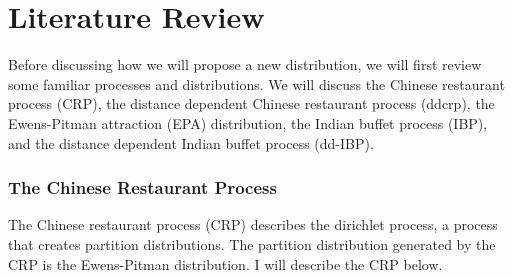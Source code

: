

\chapter{Literature Review} %
Before discussing how we will propose a new distribution, we will first review 
some familiar processes and distributions. We will discuss the Chinese restaurant 
process (CRP), the distance dependent Chinese restaurant process (ddcrp),
the Ewens-Pitman attraction (EPA) distribution, %
the Indian buffet process (IBP), and the distance dependent Indian
buffet process (dd-IBP). 

\subsection{The Chinese Restaurant Process}
The Chinese restaurant process (CRP) describes the dirichlet process, a process
that creates partition distributions. The partition distribution generated by the 
CRP is the Ewens-Pitman distribution. I will describe the CRP below.\\

